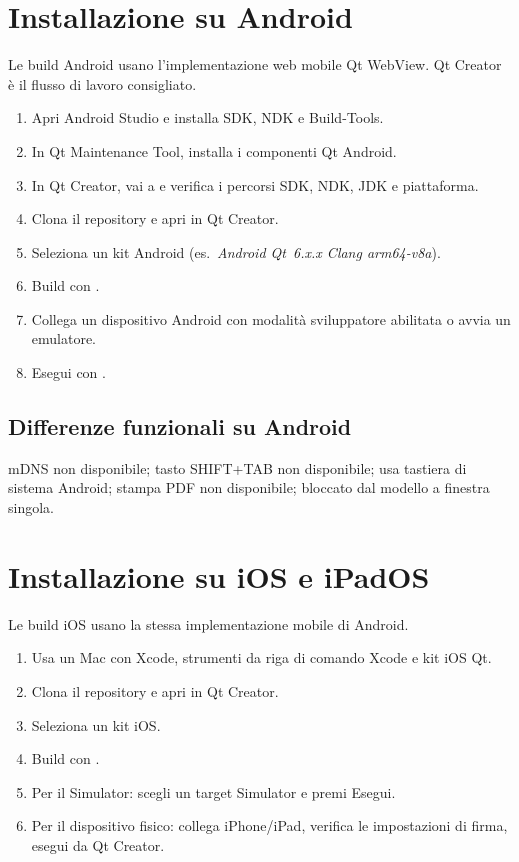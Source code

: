 \section{Installazione su Android}
\label{app:android}

Le build Android usano l'implementazione web mobile Qt WebView.
Qt Creator è il flusso di lavoro consigliato.

\begin{enumerate}
  \item Apri Android Studio e installa SDK, NDK e Build-Tools.
  \item In Qt Maintenance Tool, installa i componenti Qt Android.
  \item In Qt Creator, vai a  e verifica
        i percorsi SDK, NDK, JDK e piattaforma.
  \item Clona il repository e apri  in Qt Creator.
  \item Seleziona un kit Android (es.\ \textit{Android Qt~6.x.x Clang arm64-v8a}).
  \item Build con .
  \item Collega un dispositivo Android con modalità sviluppatore abilitata o avvia
        un emulatore.
  \item Esegui con .
\end{enumerate}

\subsection{Differenze funzionali su Android}

mDNS non disponibile; tasto SHIFT+TAB non disponibile; usa tastiera di sistema Android;
stampa PDF non disponibile;  bloccato dal modello a finestra singola.

\section{Installazione su iOS e iPadOS}
\label{app:ios}

Le build iOS usano la stessa implementazione mobile di Android.

\begin{enumerate}
  \item Usa un Mac con Xcode, strumenti da riga di comando Xcode e kit iOS Qt.
  \item Clona il repository e apri  in Qt Creator.
  \item Seleziona un kit iOS.
  \item Build con .
  \item Per il Simulator: scegli un target Simulator e premi Esegui.
  \item Per il dispositivo fisico: collega iPhone/iPad, verifica le impostazioni
        di firma, esegui da Qt Creator.
\end{enumerate}


